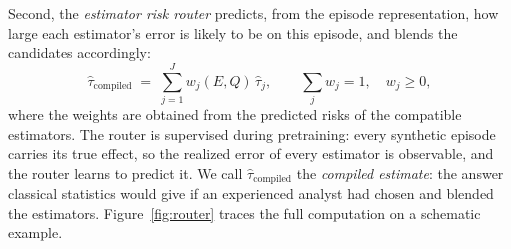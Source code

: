 \documentclass[electronics,article,submit,oneauthor]{Definitions/mdpi}
\begin{document}
Second, the \emph{estimator risk router} predicts, from the episode representation, how large each estimator's error is likely to be on this episode, and blends the candidates accordingly:
\begin{equation}
\widehat{\tau}_{\mathrm{compiled}} \;=\; \sum_{j=1}^{J} w_j(E, Q)\,\widehat{\tau}_j,
\qquad \sum_{j} w_j = 1,\quad w_j \geq 0,
\end{equation}
where the weights are obtained from the predicted risks of the compatible estimators. The router is supervised during pretraining: every synthetic episode carries its true effect, so the realized error of every estimator is observable, and the router learns to predict it. We call $\widehat{\tau}_{\mathrm{compiled}}$ the \emph{compiled estimate}: the answer classical statistics would give if an experienced analyst had chosen and blended the estimators. Figure~\ref{fig:router} traces the full computation on a schematic example.
\end{document}
